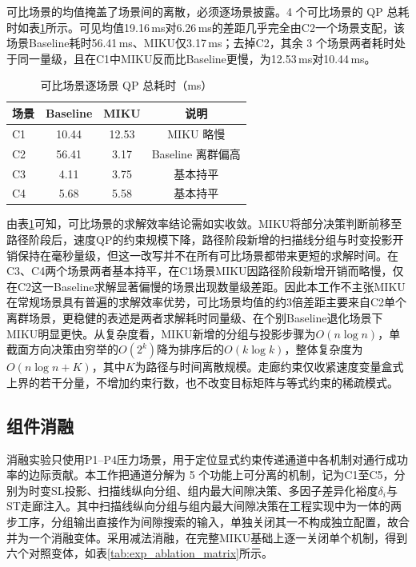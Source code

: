 \documentclass[a4paper,11pt]{ctexart}
\theoremstyle{definition}
\begin{document}
可比场景的均值掩盖了场景间的离散，必须逐场景披露。4 个可比场景的 QP 总耗时如表\ref{tab:exp_qp_percomp}所示。可见均值19.16\,ms对6.26\,ms的差距几乎完全由C2一个场景支配，该场景Baseline耗时56.41\,ms、MIKU仅3.17\,ms；去掉C2，其余 3 个场景两者耗时处于同一量级，且在C1中MIKU反而比Baseline更慢，为12.53\,ms对10.44\,ms。

\begin{table}[htbp]
\centering
\caption{可比场景逐场景 QP 总耗时（ms）}
\label{tab:exp_qp_percomp}
\small
\begin{tabular}{lccc}
\toprule
\textbf{场景} & \textbf{Baseline} & \textbf{MIKU} & \textbf{说明} \\
\midrule
C1 & 10.44 & 12.53 & MIKU 略慢 \\
C2 & 56.41 & 3.17 & Baseline 离群偏高 \\
C3 & 4.11 & 3.75 & 基本持平 \\
C4 & 5.68 & 5.58 & 基本持平 \\
\bottomrule
\end{tabular}
\end{table}

由表\ref{tab:exp_qp_percomp}可知，可比场景的求解效率结论需如实收敛。MIKU将部分决策判断前移至路径阶段后，速度QP的约束规模下降，路径阶段新增的扫描线分组与时变投影开销保持在毫秒量级，但这一改写并不在所有可比场景都带来更短的求解时间。在C3、C4两个场景两者基本持平，在C1场景MIKU因路径阶段新增开销而略慢，仅在C2这一Baseline求解显著偏慢的场景出现数量级差距。因此本工作不主张MIKU在常规场景具有普遍的求解效率优势，可比场景均值的约3倍差距主要来自C2单个离群场景，更稳健的表述是两者求解耗时同量级、在个别Baseline退化场景下MIKU明显更快。从复杂度看，MIKU新增的分组与投影步骤为$O(n \log n)$，单截面方向决策由穷举的$O(2^k)$降为排序后的$O(k \log k)$，整体复杂度为$O(n \log n + K)$，其中$K$为路径与时间离散规模。走廊约束仅收紧速度变量盒式上界的若干分量，不增加约束行数，也不改变目标矩阵与等式约束的稀疏模式。

\subsection{组件消融}
\label{subsec:exp_ablation}

消融实验只使用P1--P4压力场景，用于定位显式约束传递通道中各机制对通行成功率的边际贡献。本工作把通道分解为 5 个功能上可分离的机制，记为C1至C5，分别为时变SL投影、扫描线纵向分组、组内最大间隙决策、多因子差异化裕度$\delta_i$与ST走廊注入。其中扫描线纵向分组与组内最大间隙决策在工程实现中为一体的两步工序，分组输出直接作为间隙搜索的输入，单独关闭其一不构成独立配置，故合并为一个消融变体。采用减法消融，在完整MIKU基础上逐一关闭单个机制，得到六个对照变体，如表\ref{tab:exp_ablation_matrix}所示。
\end{document}

